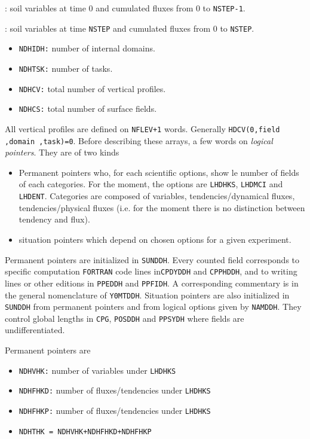 : soil variables at time 0 and cumulated fluxes from 0 to {\tt NSTEP-1}.

: soil variables at time {\tt NSTEP} and cumulated fluxes from 0 to {\tt NSTEP}.

\begin{itemize}
\item {\tt NDHIDH:} number of internal domains.
\item {\tt NDHTSK:} number of tasks.
\item {\tt NDHCV:} total number of vertical profiles.
\item {\tt NDHCS:} total number of surface fields.
\end{itemize}

All vertical profiles are defined on {\tt NFLEV+1} words. Generally {\tt HDCV(0,field ,domain ,task)=0}. 
\ms
Before describing these arrays, a few words on {\sl logical pointers}\label{poil}. They are of two kinds
\begin{itemize}
\item Permanent pointers who, for each scientific options, show le number of fields of each categories. For the moment, the options are {\tt LHDHKS}, {\tt LHDMCI} and {\tt LHDENT}. Categories are composed of variables, tendencies/dynamical fluxes, tendencies/physical fluxes (i.e. for the moment there is no distinction between tendency and flux).
\item situation pointers which depend on chosen options for a given experiment.
\end{itemize}
Permanent pointers are initialized in {\tt SUNDDH}. Every counted field corresponds to specific computation {\tt FORTRAN} code lines in{\tt CPDYDDH} and {\tt CPPHDDH}, and to writing lines or other editions in {\tt PPEDDH} and {\tt PPFIDH}. A corresponding commentary is in the general nomenclature of {\tt Y0MTDDH}.
\ms
Situation pointers are also initialized in {\tt SUNDDH} from permanent pointers and from logical options given by {\tt NAMDDH}. They control global lengths in {\tt CPG}, {\tt POSDDH} and {\tt PPSYDH} where fields are undifferentiated.
  
\ms
Permanent pointers are 
\begin{itemize}
\item {\tt NDHVHK:} number of variables under {\tt LHDHKS} 
\item {\tt NDHFHKD:} number of fluxes/tendencies under {\tt LHDHKS}
\item {\tt NDHFHKP:} number of fluxes/tendencies under {\tt LHDHKS} 
\item {\tt NDHTHK = NDHVHK+NDHFHKD+NDHFHKP}
\end{itemize}

